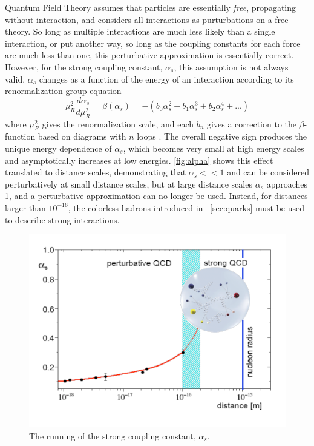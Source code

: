 
Quantum Field Theory assumes that particles are essentially \textit{free}, propagating without interaction, and considers all interactions as purturbations on a free theory. So long as multiple interactions are much less likely than a single interaction, or put another way, so long as the coupling constants for each force are much less than one, this perturbative approximation is essentially correct. However, for the strong coupling constant, $\alpha_s$, this assumption is not always valid. $\alpha_s$ changes as a function of the energy of an interaction according to its renormalization group equation
%
\begin{equation}
\mu^2_R \frac{d\alpha_s}{d\mu^2_R} = \beta(\alpha_s) = -(b_0\alpha_s^2 + b_1\alpha_s^3 + b_2\alpha_s^4 + ... )
\end{equation}
%
where $\mu^2_R$ gives the renormalization scale, and each $b_n$ gives a correction to the $\beta$-function based on diagrams with $n$ loops \cite{Agashe:2014kda}. The overall negative sign produces the unique energy dependence of $\alpha_s$, which becomes very small at high energy scales and asymptotically increases at low energies. \autoref{fig:alpha} shows this effect translated to distance scales, demonstrating that $\alpha_s<<1$ and can be considered perturbatively at small distance scales, but at large distance scales $\alpha_s$ approaches 1, and a perturbative approximation can no longer be used. Instead, for distances larger than $10^{-16}$, the colorless hadrons introduced in ~\autoref{sec:quarks} must be used to describe strong interactions.

\begin{centering}
\begin{figure}[!htb]
\myfloatalign
\includegraphics[width=.85\linewidth]{figures/theory/strong_coupling.png}
\caption{The running of the strong coupling constant, $\alpha_s$. \cite{Messchendorp:2013ysj}}
\label{fig:alpha}
\end{figure}
\end{centering}

